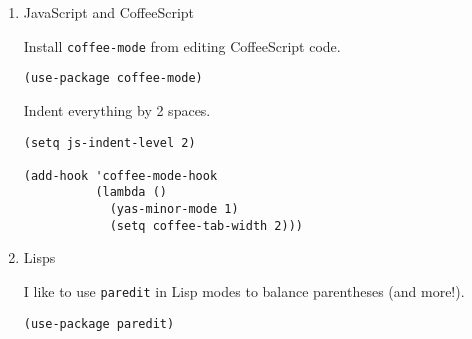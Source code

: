 \documentclass{article}
\begin{document}
\begin{enumerate}
\begin{verbatim}
(add-hook 'go-mode-hook
		  (lambda ()
			(set (make-local-variable 'company-backends)
				 '(company-go))
			(company-mode)
			(if (not (string-match "go" compile-command))
				(set (make-local-variable 'compile-command)
					 "go build -v && go test -v && go vet"))
			(flycheck-mode)))
\end{verbatim}

Config for company-go

\begin{verbatim}
(when (memq window-system '(mac ns x))
  (exec-path-from-shell-initialize))

;;For company-go
(require 'company)
(require 'company-go)

(use-package company
  :defer 2
  :diminish
  :custom
  (company-begin-commands '(self-insert-command))
  (company-idle-delay .1)
  (company-minimum-prefix-length 2)
  (company-show-numbers t)
  (company-tooltip-align-annotations 't)
  (company-tooltip-limit 20)
  (company-begin-commands '(self-insert-command))
  (global-company-mode t))

(add-hook 'go-mode-hook
	  (lambda ()
		(set (make-local-variable 'company-backends) '(company-go))
		(company-mode)))

\end{verbatim}



\item JavaScript and CoffeeScript
\label{sec:orgba8174f}

Install \texttt{coffee-mode} from editing CoffeeScript code.

\begin{verbatim}
(use-package coffee-mode)
\end{verbatim}

Indent everything by 2 spaces.

\begin{verbatim}
(setq js-indent-level 2)

(add-hook 'coffee-mode-hook
		  (lambda ()
			(yas-minor-mode 1)
			(setq coffee-tab-width 2)))
\end{verbatim}

\item Lisps
\label{sec:org19dc91a}

I like to use \texttt{paredit} in Lisp modes to balance parentheses (and more!).

\begin{verbatim}
(use-package paredit)
\end{verbatim}


\end{enumerate}
\end{document}
